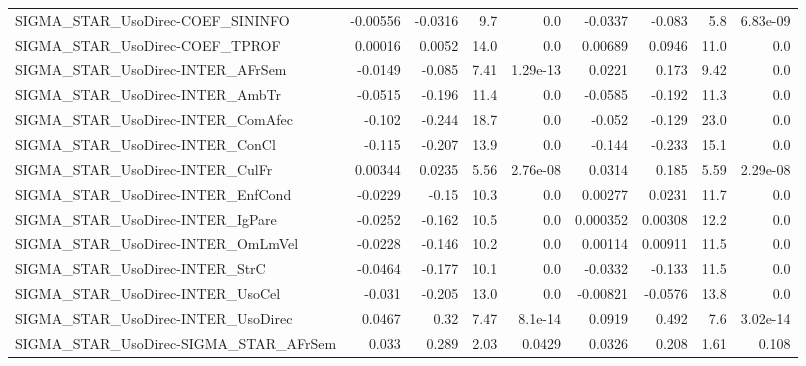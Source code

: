 \begin{tabular}{lrrrrrrrr}
SIGMA\_STAR\_UsoDirec-COEF\_SININFO       &    -0.00556 &      -0.0316 &      9.7 &      0.0 &    -0.0337 &      -0.083 &          5.8 &      6.83e-09 \\
SIGMA\_STAR\_UsoDirec-COEF\_TPROF         &     0.00016 &       0.0052 &     14.0 &      0.0 &    0.00689 &      0.0946 &         11.0 &           0.0 \\
SIGMA\_STAR\_UsoDirec-INTER\_AFrSem       &     -0.0149 &       -0.085 &     7.41 & 1.29e-13 &     0.0221 &       0.173 &         9.42 &           0.0 \\
SIGMA\_STAR\_UsoDirec-INTER\_AmbTr        &     -0.0515 &       -0.196 &     11.4 &      0.0 &    -0.0585 &      -0.192 &         11.3 &           0.0 \\
SIGMA\_STAR\_UsoDirec-INTER\_ComAfec      &      -0.102 &       -0.244 &     18.7 &      0.0 &     -0.052 &      -0.129 &         23.0 &           0.0 \\
SIGMA\_STAR\_UsoDirec-INTER\_ConCl        &      -0.115 &       -0.207 &     13.9 &      0.0 &     -0.144 &      -0.233 &         15.1 &           0.0 \\
SIGMA\_STAR\_UsoDirec-INTER\_CulFr        &     0.00344 &       0.0235 &     5.56 & 2.76e-08 &     0.0314 &       0.185 &         5.59 &      2.29e-08 \\
SIGMA\_STAR\_UsoDirec-INTER\_EnfCond      &     -0.0229 &        -0.15 &     10.3 &      0.0 &    0.00277 &      0.0231 &         11.7 &           0.0 \\
SIGMA\_STAR\_UsoDirec-INTER\_IgPare       &     -0.0252 &       -0.162 &     10.5 &      0.0 &   0.000352 &     0.00308 &         12.2 &           0.0 \\
SIGMA\_STAR\_UsoDirec-INTER\_OmLmVel      &     -0.0228 &       -0.146 &     10.2 &      0.0 &    0.00114 &     0.00911 &         11.5 &           0.0 \\
SIGMA\_STAR\_UsoDirec-INTER\_StrC         &     -0.0464 &       -0.177 &     10.1 &      0.0 &    -0.0332 &      -0.133 &         11.5 &           0.0 \\
SIGMA\_STAR\_UsoDirec-INTER\_UsoCel       &      -0.031 &       -0.205 &     13.0 &      0.0 &   -0.00821 &     -0.0576 &         13.8 &           0.0 \\
SIGMA\_STAR\_UsoDirec-INTER\_UsoDirec     &      0.0467 &         0.32 &     7.47 &  8.1e-14 &     0.0919 &       0.492 &          7.6 &      3.02e-14 \\
SIGMA\_STAR\_UsoDirec-SIGMA\_STAR\_AFrSem  &       0.033 &        0.289 &     2.03 &   0.0429 &     0.0326 &       0.208 &         1.61 &         0.108 \\

\end{tabular}
